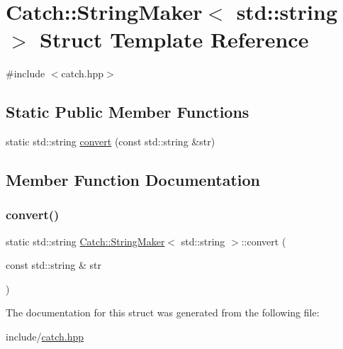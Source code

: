 \hypertarget{structCatch_1_1StringMaker_3_01std_1_1string_01_4}{}\section{Catch\+:\+:String\+Maker$<$ std\+:\+:string $>$ Struct Template Reference}
\label{structCatch_1_1StringMaker_3_01std_1_1string_01_4}


{\ttfamily \#include $<$catch.\+hpp$>$}

\subsection*{Static Public Member Functions}
\begin{DoxyCompactItemize}
\item 
static std\+::string \mbox{\hyperlink{structCatch_1_1StringMaker_3_01std_1_1string_01_4_ae065b2ecc5c1a6c4409cf06d604bd66d}{convert}} (const std\+::string \&str)
\end{DoxyCompactItemize}


\subsection{Member Function Documentation}
\mbox{\label{structCatch_1_1StringMaker_3_01std_1_1string_01_4_ae065b2ecc5c1a6c4409cf06d604bd66d}} 
\subsubsection{\texorpdfstring{convert()}{convert()}}
{\footnotesize\ttfamily static std\+::string \mbox{\hyperlink{structCatch_1_1StringMaker}{Catch\+::\+String\+Maker}}$<$ std\+::string $>$\+::convert (\begin{DoxyParamCaption}\item[{const std\+::string \&}]{str }\end{DoxyParamCaption})\hspace{0.3cm}{\ttfamily [static]}}



The documentation for this struct was generated from the following file\+:\begin{DoxyCompactItemize}
\item 
include/\mbox{\hyperlink{catch_8hpp}{catch.\+hpp}}\end{DoxyCompactItemize}
